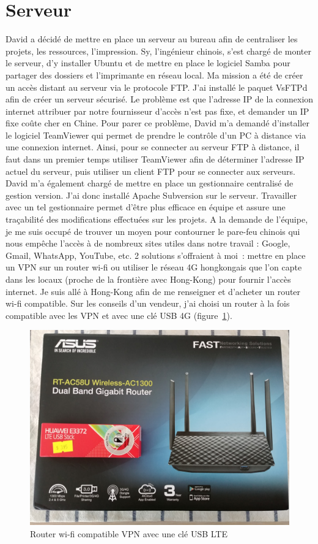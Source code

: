 \documentclass[a4paper, 12pt, sffamily]{report}
\begin{document}
\section{Serveur}
David a décidé de mettre en place un serveur au bureau afin de centraliser les projets, les ressources, l’impression. Sy, l’ingénieur chinois, s’est chargé de monter le serveur, d’y installer Ubuntu et de mettre en place le logiciel Samba pour partager des dossiers et l’imprimante en réseau local. Ma mission a été de créer un accès distant au serveur via le protocole FTP. J’ai installé le paquet VsFTPd afin de créer un serveur sécurisé. Le problème est que l’adresse IP de la connexion internet attribuer par notre fournisseur d’accès n’est pas fixe, et demander un IP fixe coûte cher en Chine. Pour parer ce problème, David m’a demandé d’installer le logiciel TeamViewer qui permet de prendre le contrôle d’un PC à distance via une connexion internet. Ainsi, pour se connecter au serveur FTP à distance, il faut dans un premier temps utiliser TeamViewer afin de déterminer l’adresse IP actuel du serveur, puis utiliser un client FTP pour se connecter aux serveurs.
David m’a également chargé de mettre en place un gestionnaire centralisé de gestion version. J’ai donc installé Apache Subversion sur le serveur. Travailler avec un tel gestionnaire permet d’être plus efficace en équipe et assure une traçabilité des modifications effectuées sur les projets.
A la demande de l’équipe, je me suis occupé de trouver un moyen pour contourner le pare-feu chinois qui nous empêche l’accès à de nombreux sites utiles dans notre travail : Google, Gmail, WhatsApp, YouTube, etc. 2 solutions s’offraient à moi~: mettre en place un VPN sur un router wi-fi ou utiliser le réseau 4G hongkongais que l’on capte dans les locaux (proche de la frontière avec Hong-Kong) pour fournir l’accès internet. Je suis allé à Hong-Kong afin de me renseigner et d’acheter un router wi-fi compatible. Sur les conseils d’un vendeur, j’ai choisi un router à la fois compatible avec les VPN et avec une clé USB 4G (figure~\ref{fig:wifi_router}).

\begin{figure}[H]
\centering
\includegraphics[scale=0.12]{figures/photos/wifi_router.jpg}
\caption{Router wi-fi compatible VPN avec une clé USB LTE}
\label{fig:wifi_router}
\end{figure}
\end{document}
